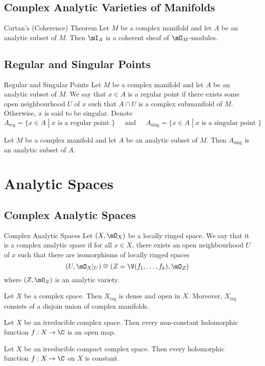 \documentclass[a4paper]{article}
\begin{document}
\subsection{Complex Analytic Varieties of Manifolds}
\begin{thm}{Cartan's (Coherence) Theorem}{} Let $M$ be a complex manifold and let $A$ be an analytic subset of $M$. Then $\mI_A$ is a coherent sheaf of $\mO_M$-modules. 
\end{thm}

\subsection{Regular and Singular Points}
\begin{defn}{Regular and Singular Points}{} Let $M$ be a complex manifold and let $A$ be an analytic subset of $M$. We say that $x\in A$ is a regular point if there exists some open neighbourhood $U$ of $x$ such that $A\cap U$ is a complex submanifold of $M$. Otherwise, $x$ is said to be singular. Denote $$A_\text{reg}=\{x\in A\;|\;x\text{ is a regular point }\}\;\;\;\;\text{ and }\;\;\;\; A_\text{sing}=\{x\in A\;|\;x\text{ is a singular point }\}$$
\end{defn}

\begin{thm}{}{} Let $M$ be a complex manifold and let $A$ be an analytic subset of $M$. Then $A_\text{sing}$ is an analytic subset of $A$. 
\end{thm}

\pagebreak
\section{Analytic Spaces}
\subsection{Complex Analytic Spaces}
\begin{defn}{Complex Analytic Spaces}{} Let $(X,\mO_X)$ be a locally ringed space. We say that it is a complex analytic space if for all $x\in X$, there exists an open neighbourhood $U$ of $x$ such that there are isomorphisms of locally ringed spaces $$(U,\mO_X|_U)\cong(Z=\V(f_1,\dots,f_k),\mO_Z)$$ where $(Z,\mO_Z)$ is an analytic variety. 
\end{defn}

\begin{thm}{}{} Let $X$ be a complex space. Then $X_\text{reg}$ is dense and open in $X$. Moreover, $X_\text{reg}$ consists of a disjoin union of complex manifolds. 
\end{thm}

\begin{thm}{}{} Let $X$ be an irreducible complex space. Then every non-constant holomorphic function $f:X\to\C$ is an open map. 
\end{thm}

\begin{crl}{}{} Let $X$ be an irreducible compact complex space. Then every holomorphic function $f:X\to\C$ on $X$ is constant. 
\end{crl}
\end{document}
